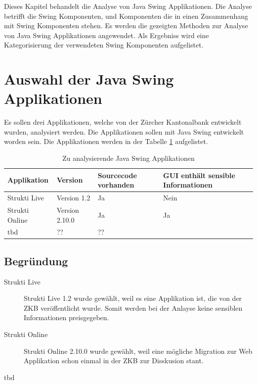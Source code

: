   Dieses Kapitel behandelt die Analyse von Java Swing Applikationen. Die
  Analyse betrifft die Swing Komponenten, und Komponenten die in einen
  Zusammenhang mit Swing Komponenten stehen. Es werden die gezeigten
  Methoden zur Analyse von Java Swing Applikationen angewendet. Als Ergebniss
  wird eine Kategorisierung der verwendeten Swing Komponenten aufgelistet.
  
  \section{Auswahl der Java Swing Applikationen}
  
  Es sollen drei Applikationen, welche von der Zürcher Kantonalbank entwickelt
  wurden, analysiert werden. Die Applikationen sollen mit Java Swing entwickelt
  worden sein. Die Applikationen werden in der Tabelle
  \ref{tab:zuAnalysierendeJavaSwingApplikationen} aufgelistet.
  \newline
  
  \begin{table}[ht]
    \begin{center}
      \begin{tabular}{llp{2cm}p{3.5cm}}
        \toprule
        Applikation & Version & Sourcecode vorhanden & GUI enthält sensible
        Informationen\\
        \midrule
        Strukti Live & Version 1.2 & Ja & Nein\\
        Strukti Online & Version 2.10.0 & Ja & Ja\\
        tbd & ?? & ??\\
        \bottomrule
      \end{tabular}
      \caption{Zu analysierende Java Swing Applikationen}
      \label{tab:zuAnalysierendeJavaSwingApplikationen}
    \end{center}
  \end{table}
  
  \subsection{Begründung}
  
  \begin{description}
  \item[Strukti Live]
  Strukti Live 1.2 wurde gewählt, weil es eine Applikation ist, die
  von der ZKB veröffentlicht wurde. Somit werden bei der Anlayse keine
  sensiblen Informationen preisgegeben.
  \item[Strukti Online]
  Strukti Online 2.10.0 wurde gewählt, weil eine mögliche Migration
  zur Web Applikation schon einmal in der \ac{ZKB} zur Disskusion stant.
  \item[tbd]
  \end{description}
  
